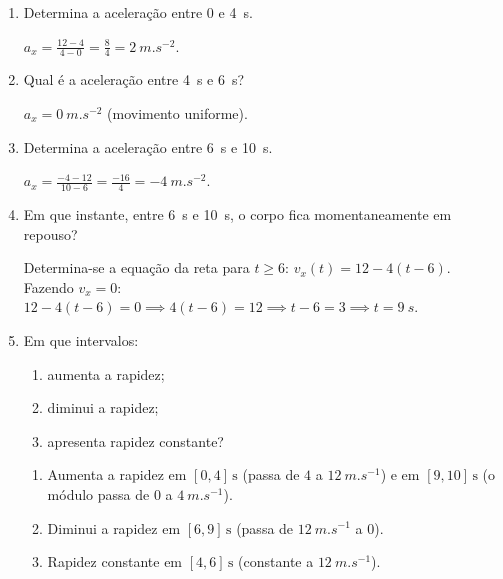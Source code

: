 \documentclass[11pt,a4paper]{article}
\begin{document}
	\begin{enumerate}[label=\textbf{\arabic*.},resume]
		
		\item Determina a aceleração entre $0$ e \SI{4}{s}.
		
		\begin{solucao}
			$a_x = \frac{12 - 4}{4 - 0} = \frac{8}{4} = \SI{2}{m.s^{-2}}$.
		\end{solucao}
		
		\item Qual é a aceleração entre \SI{4}{s} e \SI{6}{s}?
		
		\begin{solucao}
			$a_x = \SI{0}{m.s^{-2}}$ (movimento uniforme).
		\end{solucao}
		
		\item Determina a aceleração entre \SI{6}{s} e \SI{10}{s}.
		
		\begin{solucao}
			$a_x = \frac{-4 - 12}{10 - 6} = \frac{-16}{4} = \SI{-4}{m.s^{-2}}$.
		\end{solucao}
		
		\item Em que instante, entre \SI{6}{s} e \SI{10}{s}, o corpo fica
		momentaneamente em repouso?
		
		\begin{solucao}
			Determina-se a equação da reta para $t \geq 6$: $v_x(t) = 12 - 4(t - 6)$. \\
			Fazendo $v_x = 0$: $12 - 4(t - 6) = 0 \implies 4(t - 6) = 12 \implies t - 6 = 3 \implies t = \SI{9}{s}$.
		\end{solucao}
		
		\item Em que intervalos:
		
		\begin{enumerate}[label=\alph*)]
			
			\item aumenta a rapidez;
			
			\item diminui a rapidez;
			
			\item apresenta rapidez constante?
			
		\end{enumerate}
		
		\begin{solucao}
			\begin{enumerate}[label=\alph*)]
				\item Aumenta a rapidez em $[0, 4]\,\text{s}$ (passa de $4$ a $\SI{12}{m.s^{-1}}$) e em $[9, 10]\,\text{s}$ (o módulo passa de $0$ a $\SI{4}{m.s^{-1}}$).
				\item Diminui a rapidez em $[6, 9]\,\text{s}$ (passa de $\SI{12}{m.s^{-1}}$ a $0$).
				\item Rapidez constante em $[4, 6]\,\text{s}$ (constante a $\SI{12}{m.s^{-1}}$).
			\end{enumerate}
		\end{solucao}
		

\end{enumerate}
\end{document}
